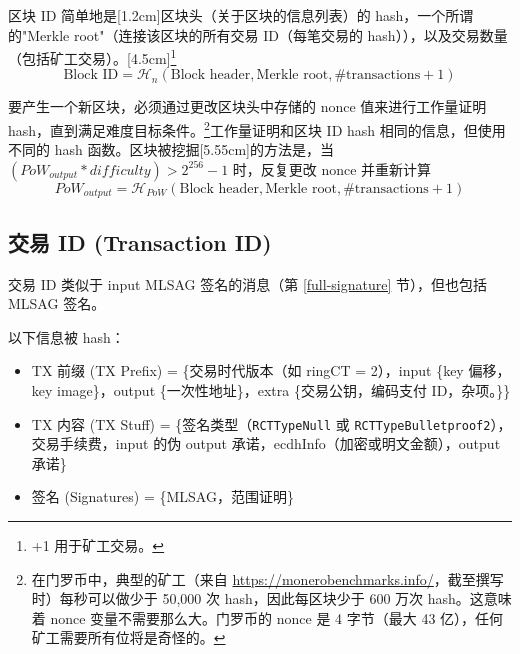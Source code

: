 {区块 ID 简单地是[1.2cm]区块头（关于区块的信息列表）的 hash，一个所谓的"Merkle root"（连接该区块的所有交易 ID（每笔交易的 hash）），以及交易数量（包括矿工交易）。[4.5cm]\footnote{+1 用于矿工交易。}\vspace{.175cm}
\[\textrm{Block ID} = \mathcal{H}_n(\textrm{Block header}, \textrm{Merkle root}, \# \textrm{transactions} + 1)\]\vspace{.05cm}

要产生一个新区块，必须通过更改区块头中存储的 nonce 值来进行工作量证明 hash，直到满足难度目标条件。\footnote{在门罗币中，典型的矿工（来自 \url{https://monerobenchmarks.info/}，截至撰写时）每秒可以做少于 50,000 次 hash，因此每区块少于 600 万次 hash。这意味着 nonce 变量不需要那么大。门罗币的 nonce 是 4 字节（最大 43 亿），任何矿工需要所有位将是奇怪的。}工作量证明和区块 ID hash 相同的信息，但使用不同的 hash 函数。区块被挖掘[5.55cm]的方法是，当 $({PoW}_{output} * {difficulty}) > 2^{256}-1$ 时，反复更改 nonce 并重新计算\vspace{.175cm}
\[{PoW}_{output} = \mathcal{H}_{PoW}(\textrm{Block header}, \textrm{Merkle root}, \# \textrm{transactions} + 1)\]


\subsection{交易 ID (Transaction ID)}
\label{subsec:transaction-id} %
交易 ID 类似于 input MLSAG 签名的消息（第 \ref{full-signature} 节），但也包括 MLSAG 签名。

以下信息被 hash：
\begin{itemize}
    \item TX 前缀 (TX Prefix)  = \{交易时代版本（如 ringCT = 2），input \{key 偏移，key image\}，output \{一次性地址\}，extra \{交易公钥，编码支付 ID，杂项。\}\}
    \item TX 内容 (TX Stuff)   = \{签名类型（{\tt RCTTypeNull} 或 {\tt RCTTypeBulletproof2}），交易手续费，input 的伪 output 承诺，ecdhInfo（加密或明文金额），output 承诺\}
    \item 签名 (Signatures) = \{MLSAG，范围证明\}
\end{itemize}

}
